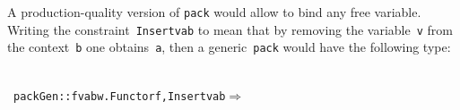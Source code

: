 \documentclass[9pt,authoryear]{sigplanconf}
\begin{document}
%
A production-quality version of \texttt{pack} would allow to bind any
    free variable. Writing the constraint{~}\texttt{Insert}\texttt{\mbox{\hspace{0.50em}}}\texttt{v}\texttt{\mbox{\hspace{0.50em}}}\texttt{a}\texttt{\mbox{\hspace{0.50em}}}\texttt{b} to mean
    that by removing the variable{~}\texttt{v} from the context{~}\texttt{b} one
    obtains{~}\texttt{a}, then a generic{~}\texttt{pack} would have the following
    type{:}%


{\nopagebreak }

%
%
%
~\\~\vphantom{$\{$}\texttt{packGen}\texttt{\mbox{\hspace{0.50em}}}\texttt{{:}{:}}\texttt{\mbox{\hspace{0.50em}}}\texttt{\makebox[1.22ex][c]{$ \forall $}}\texttt{\mbox{\hspace{0.50em}}}\texttt{f}\texttt{\mbox{\hspace{0.50em}}}\texttt{v}\texttt{\mbox{\hspace{0.50em}}}\texttt{a}\texttt{\mbox{\hspace{0.50em}}}\texttt{b}\texttt{\mbox{\hspace{0.50em}}}\texttt{w}\texttt{.}\texttt{\mbox{\hspace{0.50em}}}\texttt{\makebox[1.22ex][l]{$ {(} $}}\texttt{Functor}\texttt{\mbox{\hspace{0.50em}}}\texttt{f,}\texttt{\mbox{\hspace{0.50em}}}\texttt{Insert}\texttt{\mbox{\hspace{0.50em}}}\texttt{v}\texttt{\mbox{\hspace{0.50em}}}\texttt{a}\texttt{\mbox{\hspace{0.50em}}}\texttt{b}\texttt{\makebox[1.22ex][r]{$ {)} $}}\texttt{\mbox{\hspace{0.50em}}}\texttt{$ \Rightarrow $}\texttt{{\nopagebreak \newline%
}}
\end{document}
